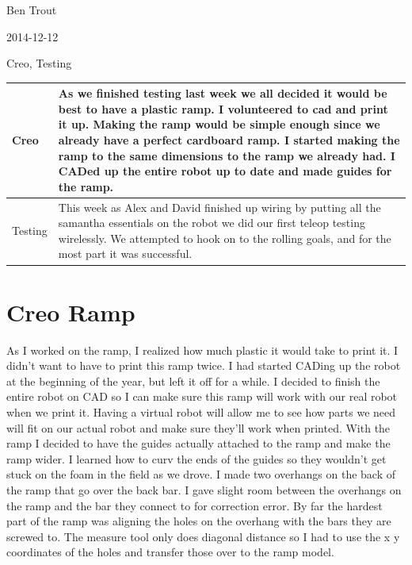 Ben Trout

2014-12-12

Creo, Testing

\begin{tabular}{|p{5cm}|p{5cm}|}
\hline
Creo&
As we finished testing last week we all decided it would be best to have a plastic ramp. I volunteered to cad and print it up. Making the ramp would be simple enough since we already have a perfect cardboard ramp. I started making the ramp to the same dimensions to the ramp we already had. I CADed up the entire robot up to date and made guides for the ramp.\\
\hline
Testing&
This week as Alex and David finished up wiring by putting all the samantha essentials on the robot we did our first teleop testing wirelessly. We attempted to hook on to the rolling goals, and for the most part it was successful.  
\\
\hline
\end{tabular}

\section*{Creo Ramp}
As I worked on the ramp, I realized how much plastic it would take to print it. I didn’t want to have to print this ramp twice. I had started CADing up the robot at the beginning of the year, but left it off for a while. I decided to finish the entire robot on CAD so I can make sure this ramp will work with our real robot when we print it. Having a virtual robot will allow me to see how parts we need will fit on our actual robot and make sure they’ll work when printed. With the ramp I decided to have the guides actually attached to the ramp and make the ramp wider. I learned how to curv the ends of the guides so they wouldn’t get stuck on the foam in the field as we drove. I made two overhangs on the back of the ramp that go over the back bar. I gave slight room between the overhangs on the ramp and the bar they connect to for correction error. By far the hardest part of the ramp was aligning the holes on the overhang with the bars they are screwed to. The measure tool only does diagonal distance so I had to use the x y coordinates of the holes and transfer those over to the ramp model. 

